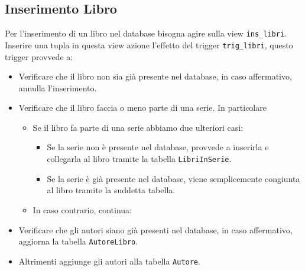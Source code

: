 \subsection{Inserimento Libro}
Per l'inserimento di un libro nel database bisogna agire sulla view \texttt{ins\_libri}.
Inserire una tupla in questa view azione l'effetto del trigger \texttt{trig\_libri}, questo trigger provvede a:
\begin{itemize}
    \item Verificare che il libro non sia gi\`a presente nel database, in caso affermativo, annulla l'inserimento.
    \item Verificare che il libro faccia o meno parte di una serie. In particolare
    \begin{itemize}
        \item Se il libro fa parte di una serie abbiamo due ulteriori casi:
        \begin{itemize}
            \item Se la serie non \`e presente nel database, provvede a inserirla e collegarla al libro tramite la tabella \texttt{LibriInSerie}.
            \item Se la serie \`e gi\`a presente nel database, viene semplicemente congiunta al libro tramite la suddetta tabella.
        \end{itemize}
        \item In caso contrario, continua:
    \end{itemize}
    \item Verificare che gli autori siano gi\`a presenti nel database, in caso affermativo, aggiorna la tabella \texttt{AutoreLibro}.
    \item Altrimenti aggiunge gli autori alla tabella \texttt{Autore}.
\end{itemize}
